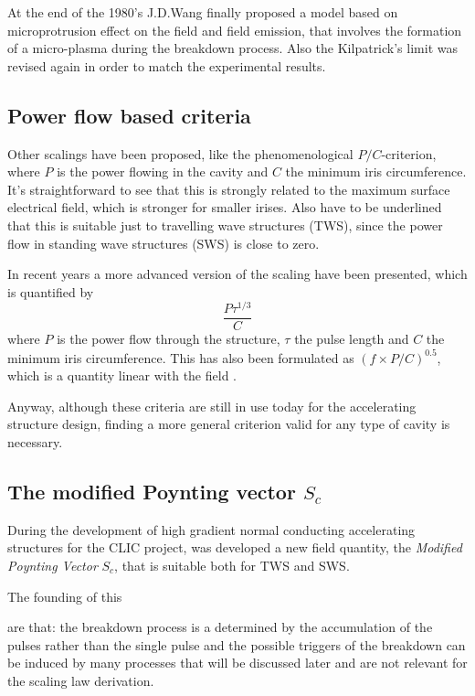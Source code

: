 At the end of the 1980's J.D.Wang finally proposed a model based on microprotrusion effect on the field and field emission, that involves the formation of a micro-plasma during the breakdown process. Also the Kilpatrick's limit was revised again in order to match the experimental results. \cite{Wang:1986, kilp:story}


\subsection[Power flow based criteria]{Power flow based criteria}

Other scalings have been proposed, like the phenomenological $P/C$-criterion, where $P$ is the power flowing in the cavity and $C$ the minimum iris circumference. It's straightforward to see that this is strongly related to the maximum surface electrical field, which is stronger for smaller irises. Also have to be underlined that this is suitable just to travelling wave structures (TWS), since the power flow in standing wave structures (SWS) is close to zero. 

In recent years a more advanced version of the scaling have been presented, which is quantified by
\begin{equation}
\frac{P \tau^{1/3}}{C}
\end{equation}
where $P$ is the power flow through the structure, $\tau$ the pulse length and $C$ the minimum iris circumference. This has also been formulated as $(f \times P/C )^{0.5}$, which is a quantity linear with the field \cite{Wuensch:1004189}.

Anyway, although these criteria are still in use today for the accelerating structure design, finding a more general criterion valid for any type of cavity is necessary.

\subsection{The modified Poynting vector $S_c$}

During the development of high gradient normal conducting accelerating structures for the CLIC project, was developed a new field quantity, the \textit{Modified Poynting Vector} $S_c$, that is suitable both for TWS and SWS. \cite{Grudiev:newLoc}

The founding of this %

are that: the breakdown process is a determined by the accumulation of the pulses rather than the single pulse and the possible triggers of the breakdown can be induced by many processes that will be discussed later and are not relevant for the scaling law derivation.

